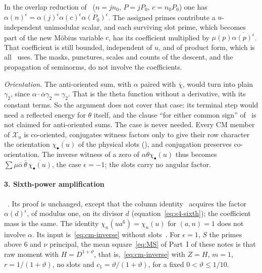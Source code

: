 \documentclass[11pt]{article}
\numberwithin{equation}{section}
\begin{document}
In the overlap reduction of~\cite{OAI78} ($n=jn_0$, $P=jP_0$, $c=n_0P_0$) one has
$\alpha(n)^\epsilon=\alpha(j)^\epsilon\alpha(c)^\epsilon\overline{\alpha(P_0)^{\epsilon}}$. The assigned primes
contribute a $u$-independent unimodular scalar, and each surviving slot prime, which becomes part of the new
Möbius variable $c$, has its coefficient multiplied by $\mu(p)\overline{\alpha(p)^{\epsilon}}$. That coefficient is
still bounded, independent of $u$, and of product form, which is all~\cite{OAI78} uses. The masks, punctures,
scales and counts of the descent, and the propagation of seminorms, do not involve the coefficients.

\emph{Orientation.} The anti-oriented sum, with $\alpha$ paired with $\overline\chi$, would turn into
plain $\gamma_2$, since $\alpha\cdot\overline\alpha\gamma_2=\gamma_2$. That is the theta function without a
derivative, with its constant terms. So the argument does not cover that case: its terminal step would need a
reflected energy for $\theta$ itself, and the clause ``for either common sign'' of~\cite[Lemma~17.1]{OAI78}
is not claimed for anti-oriented sums. The case is never needed. Every CM member of $\mathcal X_u$ is co-oriented,
\cite{OAI78} conjugates witness factors only to give their row character the orientation
$\overline{\chi_\bullet(u)}$ of the physical slots (\cite[Section~19.2]{OAI78}), and conjugation preserves
co-orientation. The inverse witness of a zero of $\alpha\theta\chi_\bullet(u)$ thus becomes
$\sum\mu\overline\alpha\,\bar\theta\,\overline{\chi_\bullet(u)}$, the case $\epsilon=-1$; the slots carry no angular
factor.

\paragraph{3. Sixth-power amplification}~\cite[Lemma~17.6]{OAI78}.
Its proof is unchanged, except that the column identity~\cite[eq.~(17.90)]{OAI78} acquires
the factor $\alpha(d)^{\epsilon}$, of modulus one, on its divisor $d$ (equation~\eqref{eq:s4-sixth}); the
coefficient mass is the same. The identity $\chi_n(ua^6)=\chi_n(u)$ for $(a,n)=1$ does not involve $\alpha$. Its
input is~\eqref{eq:cm-inverse} without slots~\cite[eq.~(17.87)]{OAI78}. For $\epsilon=1$, $S$ the primes above
$6$ and $\nu$ principal, the mean square~\eqref{eq:MS} of Part~I of these notes is that raw moment with
$H=D^{1+\vartheta}$, that is,~\eqref{eq:cm-inverse} with $Z=H$, $m=1$, $r=1/(1+\vartheta)$, no slots and
$c_1=\vartheta/(1+\vartheta)$, for a fixed $0<\vartheta\le1/10$.
\end{document}
